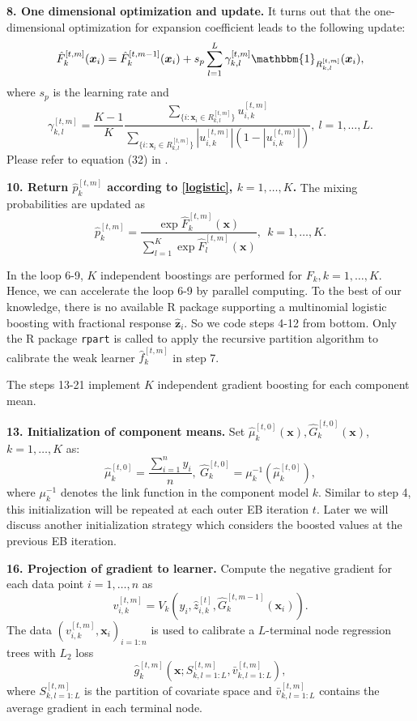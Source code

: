 \documentclass[11pt]{article}
\numberwithin{equation}{section}
\def\bx{\boldsymbol{x}}
\def\bz{\boldsymbol{z}}
\begin{document}
{\bf 8. One dimensional optimization and update.}
 It turns out that  the one-dimensional optimization for expansion coefficient leads to the following update:
		$$\hat{F}_k^{[t,m]}(\bx_i)=\hat{F}_k^{[t,m-1]}(\bx_i)+s_p\sum_{l=1}^L\gamma^{[t,m]}_{k,l}\mathbbm{1}_{R^{[t,m]}_{k,l}}(\bx_i),$$
		where $s_p$ is the learning rate and
		$$\gamma^{[t,m]}_{k,l}=\frac{K-1}{K}\frac{\sum_{\{i:\bx_i\in R_{k,l}^{[t,m]}\}}u_{i,k}^{[t,m]}}{\sum_{\{i:\bx_i\in R_{k,l}^{[t,m]}\}}\left|u_{i,k}^{[t,m]}\right|\left(1-\left|u_{i,k}^{[t,m]}\right|\right)}, ~l=1,\ldots,L.$$
Please refer to equation (32) in \citet{friedman2001greedy}.

{\bf 10. Return $\hat{p}_k^{[t,m]}$ according to \eqref{logistic}, $k=1,\ldots,K$.}
The mixing probabilities are updated as
$$\hat{p}_k^{[t,m]}=\frac{\exp{\hat{F}^{[t,m]}_k(\bx)}}{\sum_{l=1}^{K}\exp{\hat{F}^{[t,m]}_l(\bx)}},~~k=1,\ldots,K.$$


In the loop 6-9, $K$ independent boostings are performed for $F_k, k=1,\ldots,K$. Hence, we can accelerate the loop 6-9 by parallel computing.
To the best of our knowledge, there is no available R package supporting a multinomial logistic boosting with fractional response $\hat{\bz}_{i}$.
So we code steps 4-12 from bottom. Only the  R package {\tt rpart} is called to apply the recursive partition algorithm to calibrate the weak learner $\hat{f}_k^{[t,m]}$ in step 7.

The steps 13-21 implement $K$ independent gradient boosting for each component mean.

{\bf 13. Initialization of component means.} Set $\hat{\mu}_k^{[t,0]}(\bx),\hat{G}_k^{[t,0]}(\bx)$, $k=1,\ldots,K$ as:
			\begin{equation}\label{ini-2}
				\hat{\mu}_k^{[t,0]}=\frac{\sum_{i=1}^ny_i}{n},~ \hat{G}_k^{[t,0]}=\mu_k^{-1}(\hat{\mu}_k^{[t,0]}),
					\end{equation}
		where $\mu^{-1}_k$ denotes the link function in the component model $k$. 
		Similar to step 4, this initialization will be repeated at each outer EB iteration $t$. Later we will discuss another initialization strategy which considers the boosted values at the previous EB iteration.
	
{\bf 16. Projection of gradient to learner.}
		Compute the negative gradient for each data point $i=1,\ldots,n$ as 
		$$v_{i,k}^{[t,m]}=V_k(y_i,\hat{z}^{[t]}_{i,k},\hat{G}_k^{[t,m-1]}(\bx_i)).$$
		The data $(v_{i,k}^{[t,m]},\bx_i)_{i=1:n}$ is used to calibrate a $L$-terminal node regression trees with $L_2$ loss $$\hat{g}_k^{[t,m]}\left(\bx;S^{[t,m]}_{k,l=1:L},\bar{v}^{[t,m]}_{k,l=1:L}\right),$$
		 where $S^{[t,m]}_{k,l=1:L}$ is the partition of covariate space and $\bar{v}^{[t,m]}_{k,l=1:L}$ contains the average gradient in each terminal node.
		
\end{document}
